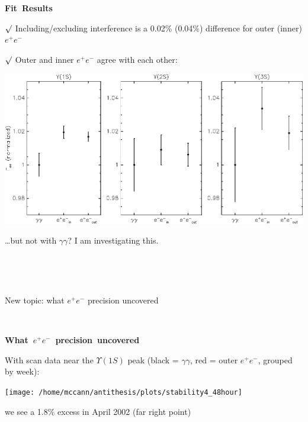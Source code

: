 \documentclass[landscape]{article}
\newenvironment{slide}[1][ ]{\mbox{\boldmath \bf #1 } \vfill}{\vfill \mbox{ } \pagebreak}
\begin{document}
\begin{slide}[Fit Results]

$\surd$ Including/excluding interference is a 0.02\% (0.04\%) difference for outer (inner) $e^+e^-$

\vfill
$\surd$ Outer and inner $e^+e^-$ agree with each other:

\vfill
\begin{center}
  \includegraphics[width=\linewidth]{octoberfits_fixen_summaryplot}
\end{center}

\vfill
\ldots but not with $\gamma\gamma$?  I am investigating this.

\vspace{-0.5 cm}

\end{slide}

\begin{slide}

\begin{center}
  New topic: what $e^+e^-$ precision uncovered
\end{center}

\end{slide}

\begin{slide}[What $e^+e^-$ precision uncovered]

With scan data near the $\Upsilon(1S)$ peak (black = $\gamma\gamma$, {\color{red} red} = outer $e^+e^-$, grouped by week):

\vfill
\begin{center}
  \texttt{[image: /home/mccann/antithesis/plots/stability4\_48hour]}
\end{center}

\vfill
we see a 1.8\% excess in April 2002 (far right point)

\vspace{-1 cm}

\end{slide}
\end{document}
